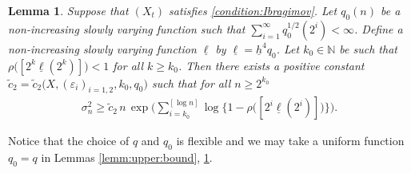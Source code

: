 \documentclass[11pt,a4,leqno]{amsart}
\newtheorem{lemma}{Lemma}[section]
\newcommand{\N}{\mathbb{N}}
\newcommand{\ud}{\underline}
\newcommand{\wt}{\widetilde}
\newcommand{\vep}{\varepsilon}
\newcommand{\1}{{\mathbf 1}}
\begin{document}
\begin{lemma}
\label{lem:lower:bound}
 Suppose that $(X_t)$ satisfies \eqref{condition:Ibragimov}. 
Let $q_0(n)$ be a non-increasing slowly varying function such that 
$\sum_{i=1}^\infty q^{1/2}_0 (2^i)<\infty$.
Define a non-increasing slowly varying function $\ud \ell$ by $\ud \ell = \ud h^4 q_0 $.  
Let $k_0\in \N$ be such that $\rho\big([2^k \ud \ell (2^k)]\big)<1$ for all $k\ge k_0$. Then there exists a positive constant 
$\wt c_2=\wt c_2\big(X,(\vep_i)_{i=1,2},k_0,q_0 \big)$ such that for all $n \ge 2^{k_0}$
\begin{align*}
 \sigma_n^2 \ge \wt c_2\,n\,\exp\bigg(
\sum_{i=k_0}^{[\log n]} \log \big\{ 1-\rho\big([2^i \ud \ell (2^i)]\big) \big\}
\bigg). 
\end{align*}
\end{lemma}

Notice that the choice of $q$ and $q_0$ is flexible and we may take  
a uniform function $q_0=q$ in Lemmas \ref{lemm:upper:bound}, \ref{lem:lower:bound}.
\end{document}
